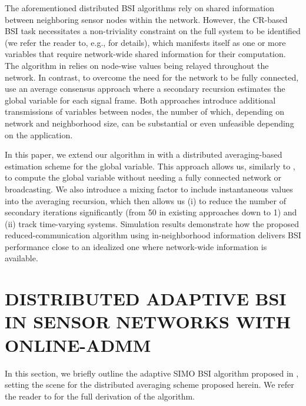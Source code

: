 \documentclass{article}
\begin{document}
The aforementioned distributed BSI algorithms rely on shared information between neighboring sensor nodes within the network.
However, the CR-based BSI task necessitates a non-triviality constraint on the full system to be identified (we refer the reader to, e.g., \cite{huangAdaptiveMultichannelLeast2002,huangClassFrequencydomainAdaptive2003} for details), which manifests itself as one or more variables that require network-wide shared information for their computation.
The algorithm in \cite{blochbergerDBSI} relies on node-wise values being relayed throughout the network.
In contrast, to overcome the need for the network to be fully connected, \cite{yuDistributedBlindSystem2014, liuDistributedBlindIdentification2016} use an average consensus \cite{xiaoFastLinearIterations2004} approach where a secondary recursion estimates the global variable for each signal frame.
Both approaches introduce additional transmissions of variables between nodes, the number of which, depending on network and neighborhood size, can be substantial or even unfeasible depending on the application.

In this paper, we extend our algorithm in \cite{blochbergerDBSI} with a distributed averaging-based \cite{xiaoFastLinearIterations2004} estimation scheme for the global variable.
This approach allows us, similarly to \cite{6334305,9914798}, to compute the global variable without needing a fully connected network or broadcasting.
We also introduce a mixing factor to include instantaneous values into the averaging recursion, which then allows us (i) to reduce the number of secondary iterations significantly (from 50 in existing approaches down to 1) and (ii) track time-varying systems.
Simulation results demonstrate how the proposed reduced-communication algorithm using in-neighborhood information delivers BSI performance close to an idealized one where network-wide information is available.

\section{DISTRIBUTED ADAPTIVE BSI IN SENSOR NETWORKS WITH ONLINE-ADMM}
\label{sec:dbsi}
In this section, we briefly outline the adaptive SIMO BSI algorithm proposed in \cite{blochbergerDBSI}, setting the scene for the distributed averaging scheme proposed herein.
We refer the reader to \cite{blochbergerDBSI} for the full derivation of the algorithm.
\end{document}
